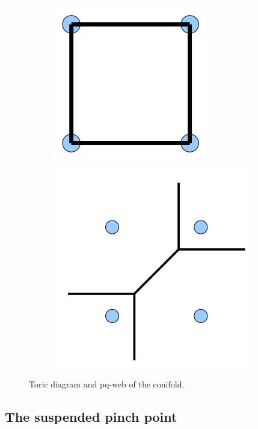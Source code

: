         \begin{figure}[H]
            \centering
            \begin{subfigure}[b]{0.3\textwidth}
                \centering
                \includegraphics[scale=0.4]{Pictures/conifoldtoricdiag.png}
                \label{fig:y equals x}
            \end{subfigure}
            \hspace{2cm}
            \begin{subfigure}[b]{0.3\textwidth}
                \centering
                \includegraphics[scale=0.3]{Pictures/conifoldpqweb.png}
                \label{fig:three sin x}
            \end{subfigure}
            \caption{Toric diagram and pq-web of the conifold.}
            \label{fig:Z5graphs}
       \end{figure}

    \subsection{The suspended pinch point}

